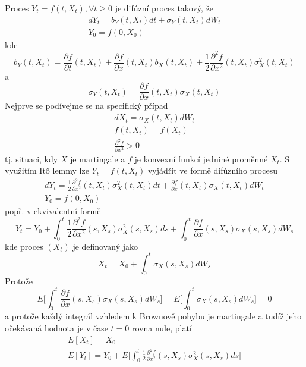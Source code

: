 \documentclass[a4paper]{book}
\begin{document}
Proces $Y_t = f(t, X_t), \forall t \ge 0$ je difúzní proces takový, že
\begin{gather*}
d Y_t = b_Y(t, X_t) dt + \sigma_Y(t, X_t)d W_t \\
Y_0 = f(0, X_0)
\end{gather*}
kde
\begin{equation*}
b_Y(t, X_t) = \frac{\partial f}{\partial t}(t, X_t) + \frac{\partial f}{\partial x}(t, X_t)b_X(t, X_t) + \frac{1}{2}\frac{\partial^2 f}{\partial x^2}(t, X_t) \sigma^2_X(t, X_t)
\end{equation*}
a
\begin{equation*}
\sigma_Y(t, X_t) = \frac{\partial f}{\partial x}(t, X_t) \sigma_X(t, X_t)
\end{equation*}
Nejprve se podívejme se na specifický případ
\begin{gather*}
d X_t = \sigma_X(t, X_t)d W_t\\
f(t, X_t) = f(X_t)\\
\frac{\partial^2 f}{\partial x^2} > 0
\end{gather*}
tj. situaci, kdy $X$ je martingale a $f$ je konvexní funkcí jedniné proměnné $X_t$. S využitím It\^o lemmy lze $Y_t = f(t, X_t)$ vyjádřit ve formě difúzního procesu
\begin{gather*}
d Y_t = \frac{1}{2} \frac{\partial^2 f}{\partial x^2}(t, X_t) \sigma^2_X(t, X_t) dt + \frac{\partial f}{\partial x}(t, X_t)\sigma_X(t, X_t)d W_t\\
Y_0 = f(0, X_0)
\end{gather*}
popř. v ekvivalentní formě
\begin{equation*}
Y_t = Y_0 + \int_0^t \frac{1}{2} \frac{\partial^2 f}{\partial x^2}(s, X_s) \sigma^2_X(s, X_s)ds + \int_0^t \frac{\partial f}{\partial x}(s, X_s)\sigma_X(s, X_s) d W_s
\end{equation*}
kde proces $(X_t)$ je definovaný jako
\begin{equation*}
X_t = X_0 + \int_0^t \sigma_X(s, X_s)d W_s
\end{equation*}
Protože
\begin{equation*}
E \Big[ \int_0^t \frac{\partial f}{\partial x}(s, X_s)\sigma_X(s, X_s) d W_s\Big] = E \Big[ \int_0^t \sigma_X(s, X_s)dW_s \Big] = 0
\end{equation*}
a protože každý integrál vzhledem k Brownově pohybu je martingale a tudíž jeho očekávaná hodnota je v čase $t = 0$ rovna nule, platí
\begin{gather*}
E[X_t] = X_0 \\
E[Y_t] = Y_0 + E \Big[ \int_0^t \frac{1}{2} \frac{\partial^2 f}{\partial x^2}(s, X_s) \sigma_X^2(s, X_s)ds\Big]
\end{gather*}
\end{document}
